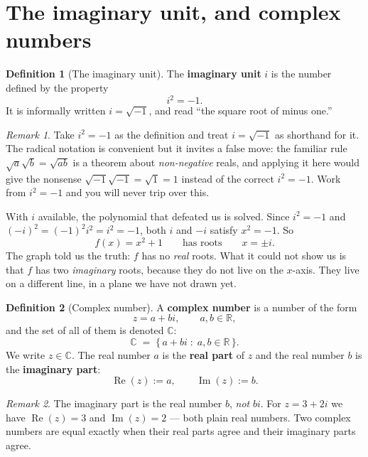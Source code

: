 \documentclass[11pt]{article}
\theoremstyle{definition}
\newtheorem{defn}{Definition}
\theoremstyle{remark}
\newtheorem*{rmk}{Remark}
\newcommand{\R}{\mathbb{R}}
\newcommand{\C}{\mathbb{C}}
\newcommand{\Rez}{\operatorname{Re}}
\newcommand{\Imz}{\operatorname{Im}}
\begin{document}
\section{The imaginary unit, and complex numbers}
\begin{defn}[The imaginary unit]
The \textbf{imaginary unit} $i$ is the number defined by the property
\[
  i^{2}=-1 .
\]
It is informally written $i=\sqrt{-1}$, and read ``the square root of minus
one.''
\end{defn}

\begin{rmk}
Take $i^{2}=-1$ as the definition and treat $i=\sqrt{-1}$ as shorthand for it.
The radical notation is convenient but it invites a false move: the familiar
rule $\sqrt{a}\sqrt{b}=\sqrt{ab}$ is a theorem about \emph{non-negative} reals,
and applying it here would give the nonsense
$\sqrt{-1}\sqrt{-1}=\sqrt{1}=1$ instead of the correct $i^{2}=-1$. Work from
$i^{2}=-1$ and you will never trip over this.
\end{rmk}

\noindent With $i$ available, the polynomial that defeated us is solved. Since
$i^{2}=-1$ and $(-i)^{2}=(-1)^{2}i^{2}=i^{2}=-1$, both $i$ and $-i$ satisfy
$x^{2}=-1$. So
\[
  f(x)=x^{2}+1
  \qquad\text{has roots}\qquad
  x=\pm i .
\]
The graph told us the truth: $f$ has no \emph{real} roots. What it could not
show us is that $f$ has two \emph{imaginary} roots, because they do not live on
the $x$-axis. They live on a different line, in a plane we have not drawn yet.

\begin{defn}[Complex number]
A \textbf{complex number} is a number of the form
\[
  z = a + bi ,
  \qquad a,b\in\R ,
\]
and the set of all of them is denoted $\C$:
\[
  \C \;=\; \bigl\{\, a+bi \;:\; a,b\in\R \,\bigr\}.
\]
We write $z\in\C$. The real number $a$ is the \textbf{real part} of $z$ and the
real number $b$ is the \textbf{imaginary part}:
\[
  \Rez(z) := a,
  \qquad
  \Imz(z) := b .
\]
\end{defn}

\begin{rmk}
The imaginary part is the real number $b$, \emph{not} $bi$. For $z=3+2i$ we have
$\Rez(z)=3$ and $\Imz(z)=2$ --- both plain real numbers. Two complex numbers are
equal exactly when their real parts agree and their imaginary parts agree.
\end{rmk}
\end{document}
